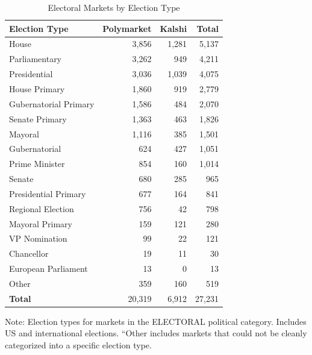 \begin{table}[htbp]
\centering
\caption{Electoral Markets by Election Type}
\label{tab:election_types}
\footnotesize
\begin{tabular}{lrrr}
\toprule
Election Type & Polymarket & Kalshi & Total \\
\midrule
House & 3,856 & 1,281 & 5,137 \\
Parliamentary & 3,262 & 949 & 4,211 \\
Presidential & 3,036 & 1,039 & 4,075 \\
House Primary & 1,860 & 919 & 2,779 \\
Gubernatorial Primary & 1,586 & 484 & 2,070 \\
Senate Primary & 1,363 & 463 & 1,826 \\
Mayoral & 1,116 & 385 & 1,501 \\
Gubernatorial & 624 & 427 & 1,051 \\
Prime Minister & 854 & 160 & 1,014 \\
Senate & 680 & 285 & 965 \\
Presidential Primary & 677 & 164 & 841 \\
Regional Election & 756 & 42 & 798 \\
Mayoral Primary & 159 & 121 & 280 \\
VP Nomination & 99 & 22 & 121 \\
Chancellor & 19 & 11 & 30 \\
European Parliament & 13 & 0 & 13 \\
Other & 359 & 160 & 519 \\
\midrule
\textbf{Total} & 20,319 & 6,912 & 27,231 \\
\bottomrule
\end{tabular}
\begin{tablenotes}
\small
\item Note: Election types for markets in the ELECTORAL political category. Includes US and international elections. ``Other includes markets that could not be cleanly categorized into a specific election type.
\end{tablenotes}
\end{table}
